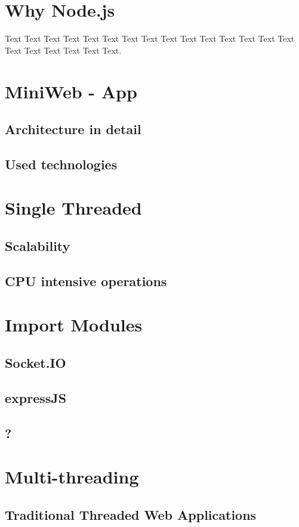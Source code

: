 \documentclass{bioinfo}
\begin{document}
\section{Why Node.js}
Text Text Text Text Text Text  Text Text Text Text Text Text Text Text Text  Text Text Text Text Text Text. 
\section{MiniWeb - App}
\subsection{Architecture in detail}
\subsection{Used technologies}

\section{Single Threaded}
\subsection{Scalability}
\subsection{CPU intensive operations}

\section{Import Modules}
\subsection{Socket.IO}
\subsection{expressJS}
\subsection{?}

\section{Multi-threading}
\subsection{Traditional Threaded Web Applications}
\end{document}
